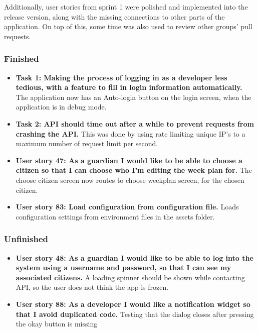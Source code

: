 Additionally, user stories from sprint 1 were polished and implemented into the release version, along with the missing connections to other parts of the application. On top of this, some time was also used to review other groups' pull requests.


\subsubsection{Finished}
\begin{itemize}
    \item \textbf{Task 1: Making the process of logging in as a developer less tedious, with a feature to fill in login information automatically.}
        \subitem The application now has an Auto-login button on the login screen, when the application is in debug mode.
    \item \textbf{Task 2: API should time out after a while to prevent requests from crashing the API.}
        \subitem This was done by using rate limiting unique IP's to a maximum number of request limit per second. 
    \item \textbf{User story 47: As a guardian I would like to be able to choose a citizen so that I can choose who I’m editing the week plan for.}
        \subitem The choose citizen screen now routes to choose weekplan screen, for the chosen citizen.
    \item \textbf{User story 83: Load configuration from configuration file.}
        \subitem Loads configuration settings from environment files in the assets folder.
\end{itemize}

\subsubsection{Unfinished}
\begin{itemize}
    \item \textbf{User story 48: As a guardian I would like to be able to log into the system using a username and password, so that I can see my associated citizens.}
        \subitem A loading spinner should be shown while contacting API, so the user does not think the app is frozen.
    \item \textbf{User story 88: As a developer I would like a notification widget so that I avoid duplicated code.}
    \subitem Testing that the dialog closes after pressing the okay button is missing
\end{itemize}

